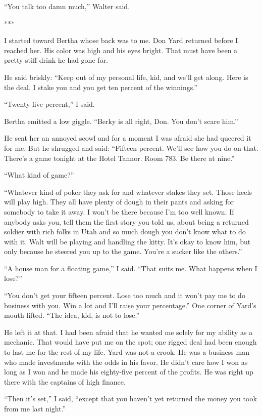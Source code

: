 \documentclass{novel}
\begin{document}
{“You talk too damn much,” Walter said.

***

I started toward Bertha whose back was to me. Don Yard returned before I reached her. His color was high and his eyes bright. That must have been a pretty stiff drink he had gone for.

He said briskly: “Keep out of my personal life, kid, and we’ll get along. Here is the deal. I stake you and you get ten percent of the winnings.”

“Twenty-five percent,” I said.

Bertha emitted a low giggle. “Berky is all right, Don. You don’t scare him.”

He sent her an annoyed scowl and for a moment I was afraid she had queered it for me. But he shrugged and said: “Fifteen percent. We’ll see how you do on that. There’s a game tonight at the Hotel Tannor. Room 783. Be there at nine.”

“What kind of game?”

“Whatever kind of poker they ask for and whatever stakes they set. Those heels will play high. They all have plenty of dough in their pants and asking for somebody to take it away. I won’t be there because I’m too well known. If anybody asks you, tell them the first story you told us, about being a returned soldier with rich folks in Utah and so much dough you don’t know what to do with it. Walt will be playing and handling the kitty. It’s okay to know him, but only because he steered you up to the game. You’re a sucker like the others.”

“A house man for a floating game,” I said. “That suits me. What happens when I lose?”

“You don’t get your fifteen percent. Lose too much and it won’t pay me to do business with you. Win a lot and I’ll raise your percentage.” One corner of Yard’s mouth lifted. “The idea, kid, is not to lose.”

He left it at that. I had been afraid that he wanted me solely for my ability as a mechanic. That would have put me on the spot; one rigged deal had been enough to last me for the rest of my life. Yard was not a crook. He was a business man who made investments with the odds in his favor. He didn’t care how I won as long as I won and he made his eighty-five percent of the profits. He was right up there with the captains of high finance.

“Then it’s set,” I said, “except that you haven’t yet returned the money you took from me last night.”

}
\end{document}
